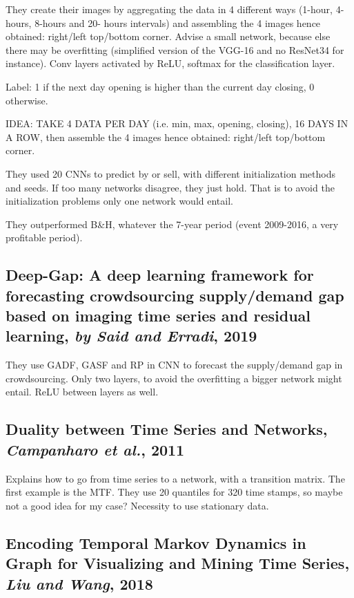 \documentclass[11pt]{article}
\begin{document}
\begin{onehalfspace}
They create their images by aggregating the data in 4 different ways (1-hour, 4-hours, 8-hours and 20- hours intervals) and assembling the 4 images hence obtained: right/left top/bottom corner. Advise a small network, because else there may be overfitting (simplified version of the VGG-16 and no ResNet34 for instance). Conv layers activated by ReLU, softmax for the classification layer.

Label: 1 if the next day opening is higher than the current day closing, 0 otherwise.

IDEA: TAKE 4 DATA PER DAY (i.e. min, max, opening, closing), 16 DAYS IN A ROW, then assemble the 4 images hence obtained: right/left top/bottom corner.

They used 20 CNNs to predict by or sell, with different initialization methods and seeds. If too many networks disagree, they just hold. That is to avoid the initialization problems only one network would entail.

They outperformed B\&H, whatever the 7-year period (event 2009-2016, a very profitable period).

\subsection{Deep-Gap: A deep learning framework for forecasting crowdsourcing supply/demand gap based on imaging time series and residual learning, \textit{by Said and Erradi}, 2019}

They use GADF, GASF and RP in CNN to forecast the supply/demand gap in crowdsourcing. Only two layers, to avoid the overfitting a bigger network 
might entail. ReLU between layers as well.

\subsection{Duality between Time Series and Networks, \textit{Campanharo et al.}, 2011}

Explains how to go from time series to a network, with a transition matrix. The first example is the MTF. They use 20 quantiles for 320 time stamps, so maybe not a good idea for my case? Necessity to use stationary data.

\subsection{Encoding Temporal Markov Dynamics in Graph for Visualizing and Mining Time Series, \textit{Liu and Wang}, 2018}


\end{onehalfspace}
\end{document}
